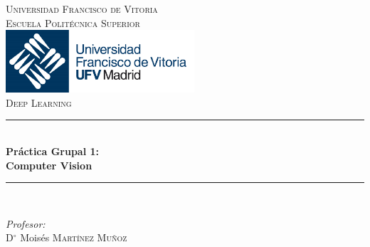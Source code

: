 \documentclass{article}
\begin{document}
\begin{titlepage}

\newcommand{\HRule}{\rule{\linewidth}{0.5mm}} 

\center 
 

\textsc{\LARGE Universidad Francisco de Vitoria}\\[1.5cm] 
\textsc{\LARGE Escuela Politécnica Superior}\\[1.5cm] 

\includegraphics[width=7cm]{imagenes/logo_ufv.png}\\[1cm] 
\textsc{\Large Deep Learning}\\[1cm]



\HRule \\[0.4cm]
{ \huge \bfseries Práctica Grupal 1: \\[0.3cm]
Computer Vision}\\[0.4cm] %
\HRule \\[1.5cm]
 

\begin{minipage}{0.5\textwidth}
    \begin{flushleft} \large
        \emph{Profesor:}\\
            D$^\circ$ Moisés \textsc{Martínez Muñoz}\\ 
    \end{flushleft}
        

\end{minipage}
\end{titlepage}
\end{document}
